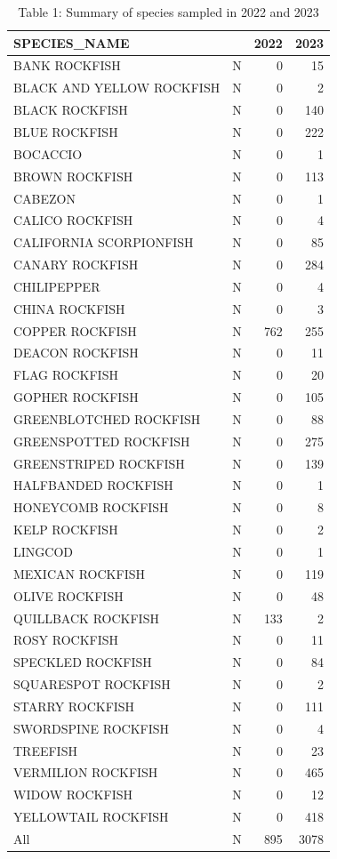 \documentclass[
  letterpaper,
  DIV=11,
  numbers=noendperiod]{scrartcl}
\begin{document}
\begin{table}

\caption{Table 1: Summary of species sampled in 2022 and 2023}
\centering
\begin{tabular}[t]{llrr}
\toprule
SPECIES\_NAME &   & 2022 & 2023\\
\midrule
BANK ROCKFISH & N & 0 & 15\\
BLACK AND YELLOW ROCKFISH & N & 0 & 2\\
BLACK ROCKFISH & N & 0 & 140\\
BLUE ROCKFISH & N & 0 & 222\\
BOCACCIO & N & 0 & 1\\
BROWN ROCKFISH & N & 0 & 113\\
CABEZON & N & 0 & 1\\
CALICO ROCKFISH & N & 0 & 4\\
CALIFORNIA SCORPIONFISH & N & 0 & 85\\
CANARY ROCKFISH & N & 0 & 284\\
CHILIPEPPER & N & 0 & 4\\
CHINA ROCKFISH & N & 0 & 3\\
COPPER ROCKFISH & N & 762 & 255\\
DEACON ROCKFISH & N & 0 & 11\\
FLAG ROCKFISH & N & 0 & 20\\
GOPHER ROCKFISH & N & 0 & 105\\
GREENBLOTCHED ROCKFISH & N & 0 & 88\\
GREENSPOTTED ROCKFISH & N & 0 & 275\\
GREENSTRIPED ROCKFISH & N & 0 & 139\\
HALFBANDED ROCKFISH & N & 0 & 1\\
HONEYCOMB ROCKFISH & N & 0 & 8\\
KELP ROCKFISH & N & 0 & 2\\
LINGCOD & N & 0 & 1\\
MEXICAN ROCKFISH & N & 0 & 119\\
OLIVE ROCKFISH & N & 0 & 48\\
QUILLBACK ROCKFISH & N & 133 & 2\\
ROSY ROCKFISH & N & 0 & 11\\
SPECKLED ROCKFISH & N & 0 & 84\\
SQUARESPOT ROCKFISH & N & 0 & 2\\
STARRY ROCKFISH & N & 0 & 111\\
SWORDSPINE ROCKFISH & N & 0 & 4\\
TREEFISH & N & 0 & 23\\
VERMILION ROCKFISH & N & 0 & 465\\
WIDOW ROCKFISH & N & 0 & 12\\
YELLOWTAIL ROCKFISH & N & 0 & 418\\
All & N & 895 & 3078\\
\bottomrule
\end{tabular}
\end{table}
\end{document}
